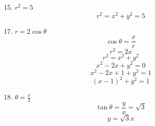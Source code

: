 \documentclass[../practica.root.tex]{subfiles}
\begin{document}
\begin{enumerate}
    \item[15.] $r^2 = 5$
          \[ r^2 = \boxed{x^2 + y^2 = 5} \]

    \item[17.] $r = 2\cos\theta$
          \[ \cos\theta = \frac{x}{r} \]
          \[ r^2 = 2x \]
          \[ r^2 = x^2 + y^2 \]
          \[ x^2 - 2x + y^2 = 0 \]
          \[ x^2 - 2x + 1 + y^2 = 1 \]
          \[ \boxed{(x-1)^2 + y^2 = 1} \]

    \item[18.] $\theta = \frac{\pi}{3}$
          \[ \tan\theta = \frac{y}{x} = \sqrt{3} \]
          \[ \boxed{y = \sqrt{3}x} \]

\end{enumerate}
\end{document}
